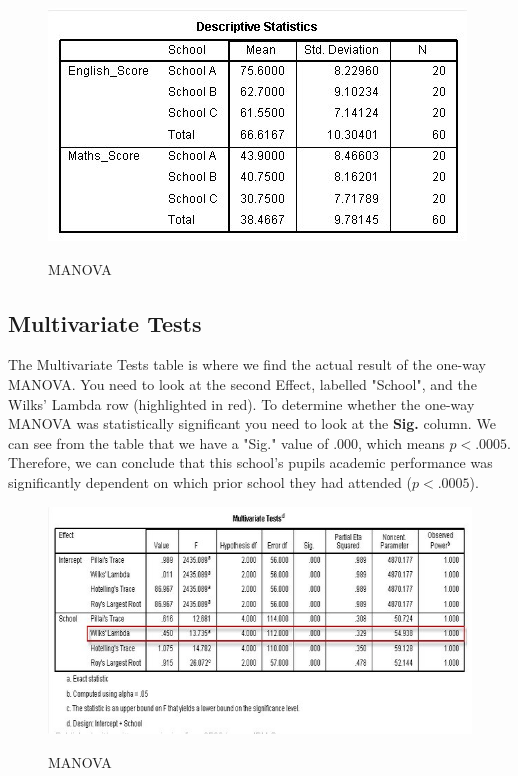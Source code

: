 \documentclass[a4paper,12pt]{article}
\begin{document}
\begin{center}
	\begin{figure}[h!]
		\includegraphics[scale=0.6]{MANOVA8}\\
		\caption{MANOVA}
	\end{figure}
\end{center}






\subsection{Multivariate Tests}
The Multivariate Tests table is where we find the actual result of the one-way MANOVA. You need to look at the second Effect, labelled "School", and the Wilks' Lambda row (highlighted in red). To determine whether the one-way MANOVA was statistically significant you need to look at the \textbf{Sig.} column. We can see from the table that we have a "Sig." value of .000, which means $p < .0005$. Therefore, we can conclude that this school's pupils academic performance was significantly dependent on which prior school they had attended ($p < .0005$).


\begin{center}
	\begin{figure}[h!]
		\includegraphics[scale=0.6]{MANOVA7}\\
		\caption{MANOVA}
	\end{figure}
\end{center}
\end{document}
